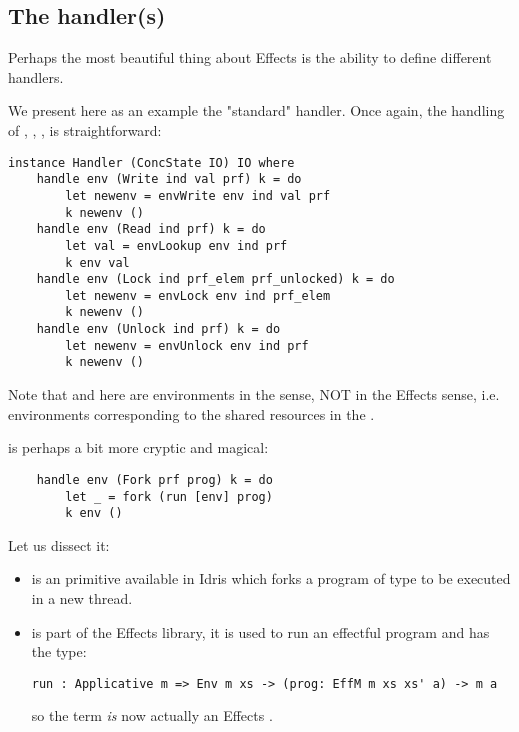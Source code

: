 \subsection{The handler(s)}

Perhaps the most beautiful thing about Effects is the ability to define
different handlers. %

We present here as an example the "standard"  handler. Once again, the
handling of , , ,  is
straightforward:

\begin{verbatim}
instance Handler (ConcState IO) IO where
    handle env (Write ind val prf) k = do
        let newenv = envWrite env ind val prf
        k newenv ()
    handle env (Read ind prf) k = do
        let val = envLookup env ind prf
        k env val
    handle env (Lock ind prf_elem prf_unlocked) k = do
        let newenv = envLock env ind prf_elem
        k newenv ()
    handle env (Unlock ind prf) k = do
        let newenv = envUnlock env ind prf
        k newenv ()
\end{verbatim}

Note that  and  here are environments in the
 sense, NOT in the Effects sense, i.e. environments corresponding
to the shared resources in the .

 is perhaps a bit more cryptic and magical:

\begin{verbatim}
    handle env (Fork prf prog) k = do
        let _ = fork (run [env] prog)
        k env ()
\end{verbatim}

Let us dissect it:

\begin{itemize}
    \item {} is an  primitive available in Idris which forks
        a program of type  to be executed in a new thread.
    \item {} is part of the Effects library, it is used to run an
    effectful program and has the type:
    \begin{verbatim}
run : Applicative m => Env m xs -> (prog: EffM m xs xs' a) -> m a
    \end{verbatim}
    so the term \code{[env]} \emph{is} now actually an Effects .
\end{itemize}

